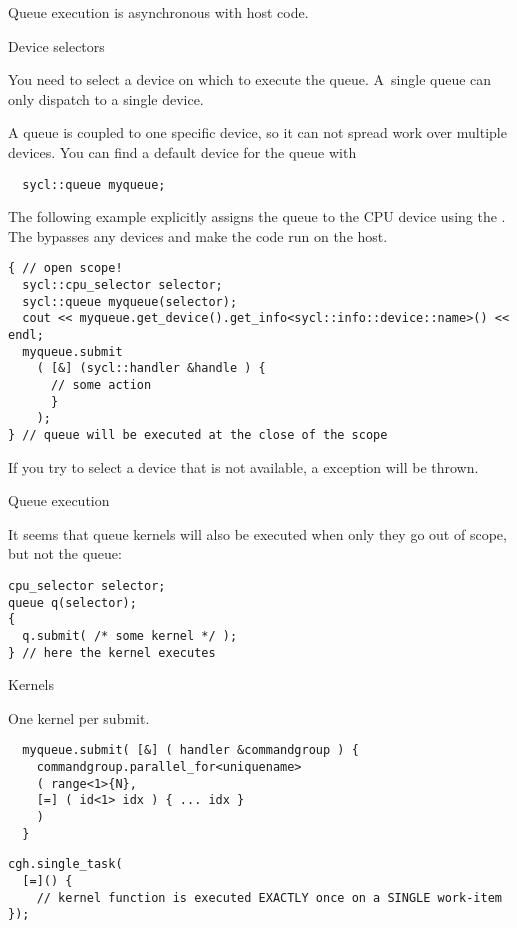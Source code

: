 Queue execution is asynchronous with host code.

 {Device selectors}

You need to select a device on which to execute the queue.
A~single queue can only dispatch to a single device.

A queue is coupled to one specific device,
so it can not spread work over multiple devices.
You can find a default device for the queue with
\begin{lstlisting}
  sycl::queue myqueue;
\end{lstlisting}

The following example explicitly assigns the queue to the CPU device
using the .
The  bypasses any devices and
make the code run on the host.



\begin{lstlisting}
{ // open scope!
  sycl::cpu_selector selector;
  sycl::queue myqueue(selector);
  cout << myqueue.get_device().get_info<sycl::info::device::name>() << endl;
  myqueue.submit
    ( [&] (sycl::handler &handle ) {
      // some action
      }
    );
} // queue will be executed at the close of the scope
\end{lstlisting}

If you try to select a device that is not available,
a  exception will be thrown.

 {Queue execution}

It seems that queue kernels will also be executed when only they
go out of scope, but not the queue:
\begin{lstlisting}
cpu_selector selector;
queue q(selector);
{
  q.submit( /* some kernel */ );
} // here the kernel executes
\end{lstlisting}

 {Kernels}

One kernel per submit.

\begin{lstlisting}
  myqueue.submit( [&] ( handler &commandgroup ) {
    commandgroup.parallel_for<uniquename> 
    ( range<1>{N},
    [=] ( id<1> idx ) { ... idx }
    )
  }
\end{lstlisting}

\begin{lstlisting}
cgh.single_task(
  [=]() {
    // kernel function is executed EXACTLY once on a SINGLE work-item
});
\end{lstlisting}


